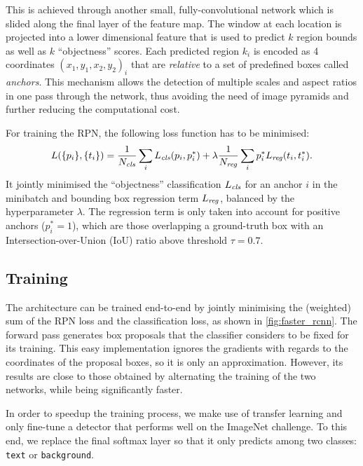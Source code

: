 		This is achieved through another small, fully-convolutional network which is slided along the final layer of the feature map. The window at each location is projected into a lower dimensional feature that is used to predict \(k\) region bounds as well as \(k\) ``objectness'' scores. Each predicted region \(k_i\) is encoded as 4  coordinates \((x_1, y_1, x_2, y_2)_i\) that are \emph{relative} to a set of predefined boxes called \emph{anchors}. This mechanism allows the detection of multiple scales and aspect ratios in one pass through the network, thus avoiding the need of image pyramids and further reducing the computational cost.

		For training the RPN, the following loss function has to be minimised:
		\begin{equation}\label{eq:rpn_loss}
		L(\{p_i\}, \{t_i\}) = \frac{1}{N_{\mathit{cls}}}\sum_i L_{\mathit{cls}}(p_i, p^{*}_i) + \lambda\frac{1}{N_{\mathit{reg}}}\sum_i  p^{*}_i L_{\mathit{reg}}(t_i, t^{*}_i).
		\end{equation}
		It jointly minimised  the ``objectness'' classification  \(L_{\mathit{cls}}\) for an anchor \(i\) in the minibatch and bounding box regression term \(L_{\mathit{reg}}\), balanced by the hyperparameter \(\lambda\). The regression term is only taken into account for positive anchors (\(p^{*}_i = 1\)), which are those overlapping a ground-truth box with an Intersection-over-Union (IoU) ratio above threshold \(\tau = 0.7\).


	\subsection{Training}\label{sec:frcnn_train}
		The \FRCNN{} architecture can be trained end-to-end by jointly minimising the (weighted) sum of the RPN loss and the classification loss, as shown in \autoref{fig:faster_rcnn}. The forward pass generates box proposals that the classifier considers to be fixed for its training. This easy implementation ignores the gradients with regards to the coordinates of the proposal boxes, so it is only an approximation. However, its results are close to those obtained by alternating the training of the two networks, while being significantly faster.

		In order to speedup the training process, we make use of transfer learning and only fine-tune a detector that performs well on the ImageNet challenge. To this end, we replace the final softmax layer so that it only predicts among two classes: \texttt{text} or \texttt{background}.

